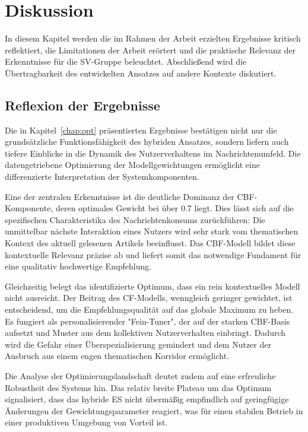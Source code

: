 \section{Diskussion}
In diesem Kapitel werden die im Rahmen der Arbeit erzielten Ergebnisse kritisch reflektiert, 
die Limitationen der Arbeit erörtert und die praktische Relevanz der Erkenntnisse für die \ac{SV-Gruppe} beleuchtet. 
Abschließend wird die Übertragbarkeit des entwickelten Ansatzes auf andere Kontexte diskutiert.
\subsection{Reflexion der Ergebnisse}
Die in Kapitel~\ref{chap:opt} präsentierten Ergebnisse bestätigen nicht nur die grundsätzliche Funktionsfähigkeit 
des hybriden Ansatzes, sondern liefern auch tiefere Einblicke in die Dynamik des Nutzerverhaltens im Nachrichtenumfeld. 
Die datengetriebene Optimierung der Modellgewichtungen ermöglicht eine differenzierte Interpretation der 
Systemkomponenten.

Eine der zentralen Erkenntnisse ist die deutliche Dominanz der \ac{CBF}-Komponente, deren optimales Gewicht 
bei über 0.7 liegt. Dies lässt sich auf die spezifischen Charakteristika des Nachrichtenkonsums zurückführen: 
Die unmittelbar nächste Interaktion eines Nutzers wird sehr stark vom thematischen Kontext des aktuell gelesenen 
Artikels beeinflusst. Das \ac{CBF}-Modell bildet diese kontextuelle Relevanz präzise ab und liefert somit das 
notwendige Fundament für eine qualitativ hochwertige Empfehlung.

Gleichzeitig belegt das identifizierte Optimum, dass ein rein kontextuelles Modell nicht ausreicht. Der Beitrag des 
\ac{CF}-Modells, wenngleich geringer gewichtet, ist entscheidend, um die Empfehlungsqualität auf das globale 
Maximum zu heben. Es fungiert als personalisierender "Fein-Tuner", der auf der starken \ac{CBF}-Basis aufsetzt 
und Muster aus dem kollektiven Nutzerverhalten einbringt. Dadurch wird die Gefahr einer Überspezialisierung 
gemindert und dem Nutzer der Ausbruch aus einem engen thematischen Korridor ermöglicht.

Die Analyse der Optimierungslandschaft deutet zudem auf eine erfreuliche Robustheit des Systems hin. Das relativ 
breite Plateau um das Optimum signalisiert, dass das hybride \ac{ES} nicht übermäßig empfindlich auf geringfügige 
Änderungen der Gewichtungsparameter reagiert, was für einen stabilen Betrieb in einer produktiven Umgebung von 
Vorteil ist.

